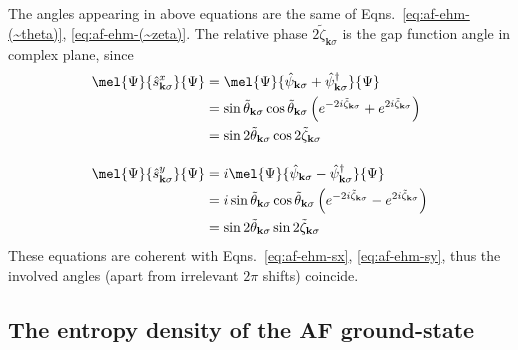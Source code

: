 The angles appearing in above equations are the same of Eqns.~\eqref{eq:af-ehm-(~theta)}, \eqref{eq:af-ehm-(~zeta)}. The relative phase $2 \tilde{\zeta}_{\mathbf{k}\sigma}$ is the gap function angle in complex plane, since
\[
\begin{aligned}
	\mel{\Psi}{\hat s_{\mathbf{k}\sigma}^x}{\Psi} &= \mel{\Psi}{\hat \psi_{\mathbf{k}\sigma} + \hat \psi_{\mathbf{k}\sigma}^\dagger}{\Psi} \\
	&= \sin \tilde{\theta}_{\mathbf{k}\sigma} \cos \tilde{\theta}_{\mathbf{k}\sigma} \left(
	e^{-2i \tilde{\zeta}_{\mathbf{k}\sigma}} + e^{2i \tilde{\zeta}_{\mathbf{k}\sigma}}
	\right) \\
	&= \sin 2\tilde{\theta}_{\mathbf{k}\sigma} \cos 2\tilde{\zeta}_{\mathbf{k}\sigma} \\[1em]
	\mel{\Psi}{\hat s_{\mathbf{k}\sigma}^y}{\Psi} &= i \mel{\Psi}{\hat \psi_{\mathbf{k}\sigma} - \hat \psi_{\mathbf{k}\sigma}^\dagger}{\Psi} \\
	&= i \sin \tilde{\theta}_{\mathbf{k}\sigma} \cos \tilde{\theta}_{\mathbf{k}\sigma} \left(
	e^{-2i \tilde{\zeta}_{\mathbf{k}\sigma}} - e^{2i \tilde{\zeta}_{\mathbf{k}\sigma}}
	\right) \\
	&= \sin 2\tilde{\theta}_{\mathbf{k}\sigma} \sin 2\tilde{\zeta}_{\mathbf{k}\sigma}
\end{aligned}
\]
These equations are coherent with Eqns.~\eqref{eq:af-ehm-sx}, \eqref{eq:af-ehm-sy}, thus the involved angles (apart from irrelevant $2\pi$ shifts) coincide.

\subsection{The entropy density of the AF ground-state}\label{subsec:af-s}

